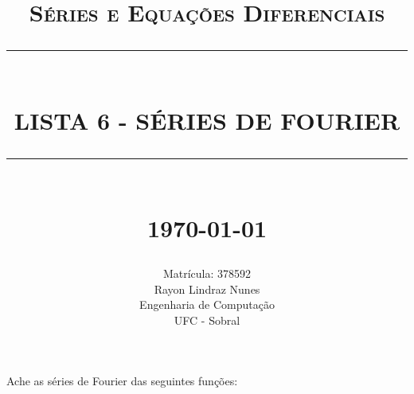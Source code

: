 \documentclass[12pt]{article}
\newcommand{\HRule}[1]{\rule{\linewidth}{#1}}
\begin{document}
\title{ \normalsize \textsc{Séries e Equações Diferenciais}
		\\ [2.0cm]
		\HRule{0.5pt} \\
		\LARGE \textbf{\uppercase{Lista 6 - Séries de Fourier}}
		\HRule{2pt} \\ [0.5cm]
		\normalsize \today \vspace*{5\baselineskip}}
\date{}

\author{
		Matrícula: 378592 \\ 
		Rayon Lindraz Nunes \\
		Engenharia de Computação\\ 
        UFC - Sobral}

\maketitle
\newpage


Ache as séries de Fourier das seguintes funções:
\end{document}
